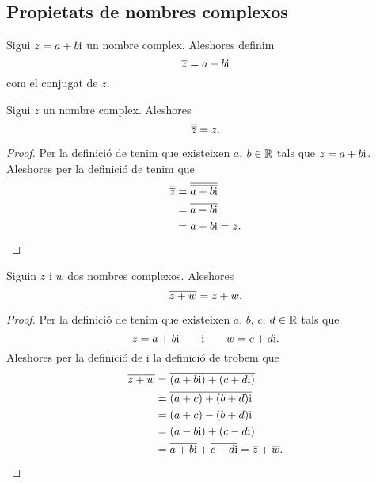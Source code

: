 \documentclass[../../Main.tex]{subfiles}
\begin{document}
	\subsection{Propietats de nombres complexos}
	\begin{definition}
		\label{def:conjugat d'un nombre complex}
		Sigui \(z = a+b\mathrm{i}\) un nombre complex.
        Aleshores definim
		\[
            \overline{z} = a-b\mathrm{i}
        \]
		com el conjugat de \(z\).
	\end{definition}
	\begin{proposition}
		\label{prop:el conjugat del conjugat d'un nombre complex és ell mateix}
		Sigui \(z\) un nombre complex.
        Aleshores
		\[
            \overline{\overline{z}} = z.
        \]
		\begin{proof}
			Per la definició de  tenim que existeixen \(a\), \(b\in\mathbb{R}\) tals que \(z = a+b\mathrm{i}\).
            Aleshores per la definició de  tenim que
			\begin{align*}
				\overline{\overline{z}} &= \overline{\overline{a+b\mathrm{i}}} \\
				 &= \overline{a-b\mathrm{i}} \\
				 &= a+b\mathrm{i} = z.\qedhere
			\end{align*}
		\end{proof}
	\end{proposition}
	\begin{proposition}
		\label{prop:el conjugat de la suma és la suma de conjugats}
		Siguin \(z\) i \(w\) dos nombres complexos.
        Aleshores
		\[
            \overline{z+w} = \overline{z}+\overline{w}.
        \]
		\begin{proof}
			Per la definició de  tenim que existeixen \(a\), \(b\), \(c\), \(d\in\mathbb{R}\) tals que
			\[
                z = a+b\mathrm{i}\qquad\text{i}\qquad w = c+d\mathrm{i}.
            \]
			Aleshores per la definició de  i la definició de  trobem que
			\begin{align*}
				\overline{z+w} &= \overline{(a+b\mathrm{i})+(c+d\mathrm{i})} \\
				 &= \overline{(a+c)+(b+d)\mathrm{i}} \\
				 &= (a+c)-(b+d)\mathrm{i} \\
				 &= (a-b\mathrm{i})+(c-d\mathrm{i}) \\
				 &= \overline{a+b\mathrm{i}}+\overline{c+d\mathrm{i}} = \overline{z}+\overline{w}.\qedhere
			\end{align*}
		\end{proof}
	\end{proposition}
\end{document}
